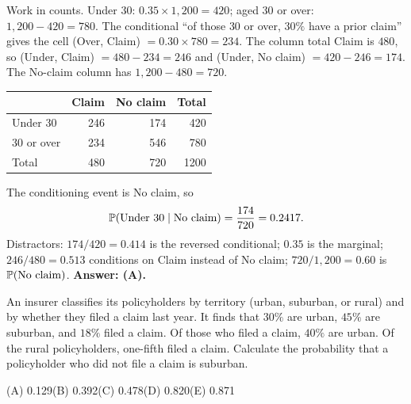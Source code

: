 \begin{solution}
Work in counts. Under $30$: $0.35 \times 1{,}200 = 420$; aged $30$ or over:
$1{,}200 - 420 = 780$. The conditional ``of those $30$ or over, $30\%$ have a
prior claim'' gives the cell (Over, Claim) $= 0.30 \times 780 = 234$. The
column total Claim is $480$, so (Under, Claim) $= 480 - 234 = 246$ and
(Under, No claim) $= 420 - 246 = 174$. The No-claim column has
$1{,}200 - 480 = 720$.

\begin{center}
\begin{tabular}{@{}lrrr@{}}
\toprule
 & Claim & No claim & Total \\
\midrule
Under 30 & 246 & 174 & 420 \\
30 or over & 234 & 546 & 780 \\
\midrule
Total & 480 & 720 & 1200 \\
\bottomrule
\end{tabular}
\end{center}

The conditioning event is No claim, so
\[
\mathbb{P}(\text{Under } 30 \mid \text{No claim}) = \frac{174}{720} = 0.2417 .
\]
Distractors: $174/420 = 0.414$ is the reversed conditional; $0.35$ is the
marginal; $246/480 = 0.513$ conditions on Claim instead of No claim;
$720/1{,}200 = 0.60$ is $\mathbb{P}(\text{No claim})$.
\textbf{Answer: (A).}
\end{solution}

\begin{example}
An insurer classifies its policyholders by territory (urban, suburban, or
rural) and by whether they filed a claim last year. It finds that $30\%$ are
urban, $45\%$ are suburban, and $18\%$ filed a claim. Of those who filed a
claim, $40\%$ are urban. Of the rural policyholders, one-fifth filed a claim.
Calculate the probability that a policyholder who did not file a claim is
suburban.

\medskip
(A) 0.129\qquad (B) 0.392\qquad (C) 0.478\qquad (D) 0.820\qquad (E) 0.871
\end{example}

